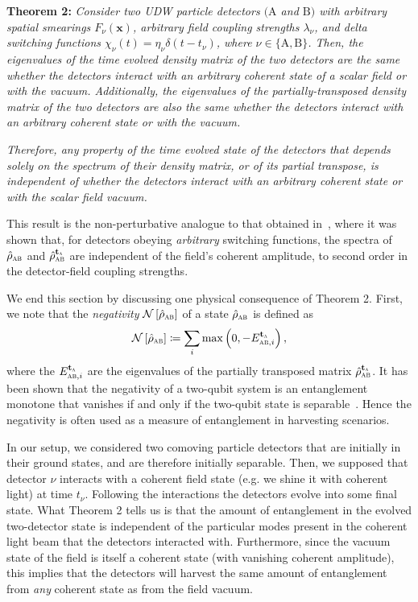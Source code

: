 \documentclass[pra,nofootinbib,floats,aps,twocolumn,tightenlines,superscriptaddress]{revtex4-1}
\newcommand{\rhoab}{\hat{\rho}_\textsc{ab}}
\newcommand{\rhoabpt}{\hat{\rho}_\textsc{ab}^{{\text{\textbf{t}}}_\textsc{a}}}
\begin{document}
\vspace{2mm}
\textbf{Theorem 2:}
\textit{
Consider two UDW particle detectors $\mathrm{(A}$ and $\mathrm{B)}$ with arbitrary spatial smearings $F_\nu(\bm x)$, arbitrary field coupling strengths $\lambda_\nu$, and delta switching functions \mbox{$\chi_\nu(t)=\eta_\nu\delta(t-t_\nu)$}, where $\nu\in\{\mathrm{A},\mathrm{B} \}$. Then, the eigenvalues of the time evolved density matrix of the two detectors are the same whether the detectors interact with an arbitrary coherent state of a scalar field or with the vacuum. Additionally, the eigenvalues of the partially-transposed density matrix of the two detectors are also the same whether the detectors interact with an arbitrary coherent state or with the vacuum.}

\textit{Therefore, any property of the time evolved state of the detectors that depends solely on the spectrum of their density matrix, or of its partial transpose, is independent of whether the detectors interact with an arbitrary coherent state or with the scalar field vacuum.}
\vspace{2mm}

This result is the non-perturbative analogue to that obtained in~\cite{Simidzija2017b},
where it was shown that, for detectors obeying \textit{arbitrary} switching functions, the spectra of $\rhoab$ and $\rhoabpt$ are independent of the field's coherent amplitude, to second order in the detector-field coupling strengths. 

We end this section by discussing one physical consequence of Theorem 2. First, we note that the \textit{negativity} $\mathcal{N}\left[\rhoab\right]$ of a state $\rhoab$ is defined as~\cite{Vidal2002}
\begin{equation}
\label{eq:neg}
    \mathcal{N}\left[\rhoab\right]
    \coloneqq
    \sum_i
    \max
    \left(0,-E_{\textsc{ab},i}^{{\text{\textbf{t}}}_\textsc{a}}
    \right),
\end{equation}
where the $E_{\textsc{ab},i}^{{\text{\textbf{t}}}_\textsc{a}}$ are the eigenvalues of the partially transposed matrix $\rhoabpt$. It has been shown that the negativity of a two-qubit system is an entanglement monotone that vanishes if and only if the two-qubit state is separable~\cite{Peres1996,Horodecki1996}. Hence the negativity is often used as a measure of entanglement in harvesting scenarios.

In our setup, we considered two comoving particle detectors that are initially in their ground states, and are therefore initially separable. Then, we supposed that detector $\nu$ interacts with a coherent field state (e.g. we shine it with coherent light) at time $t_\nu$. Following the interactions the detectors evolve into some final state. What Theorem 2 tells us is that the amount of entanglement in the evolved two-detector state is independent of the particular modes present in the coherent light beam that the detectors interacted with. Furthermore, since the vacuum state of the field is itself a coherent state (with vanishing coherent amplitude), this implies that the detectors will harvest the same amount of entanglement from \textit{any} coherent state as from the field vacuum.
\end{document}
